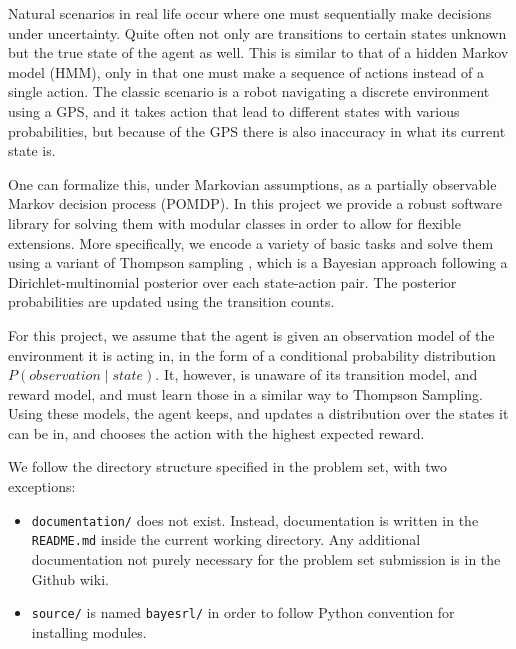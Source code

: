 \documentclass{pset}
\begin{document}

Natural scenarios in real life occur where one must sequentially make decisions
under uncertainty. Quite often not only are transitions to certain states
unknown but the true state of the agent as well. This is similar to that of a
hidden Markov model (HMM), only in that one must make a sequence of actions
instead of a single action. The classic scenario is a robot navigating a
discrete environment using a GPS, and it takes action that lead to different
states with various probabilities, but because of the GPS there is also
inaccuracy in what its current state is.

One can formalize this, under Markovian assumptions, as a partially observable
Markov decision process (POMDP). In this project we provide a robust software
library for solving them with modular classes in order to allow for flexible
extensions.  More specifically, we encode a variety of basic tasks and solve
them using a variant of Thompson sampling \cite{strens2000bayesian}, which is a Bayesian approach
following a Dirichlet-multinomial posterior over each state-action pair. The
posterior probabilities are updated using the transition counts.

For this project, we assume that the agent is given an observation model of the
environment it is acting in, in the form of a conditional probability distribution
$P(observation \mid state)$. It, however, is unaware of its transition model, and
reward model, and must learn those in a similar way to Thompson Sampling.
Using these models, the agent keeps, and updates a distribution over the states
it can be in, and chooses the action with the highest expected reward.

We follow the directory structure specified in the problem set, with two
exceptions:
\begin{itemize}
\item \texttt{documentation/} does not exist. Instead, documentation is written
in the \texttt{README.md} inside the current working directory. Any additional
documentation not purely necessary for the problem set submission is in the
Github wiki.
\item \texttt{source/} is named \texttt{bayesrl/} in order to follow Python
convention for installing modules.
\end{itemize}




\end{document}
